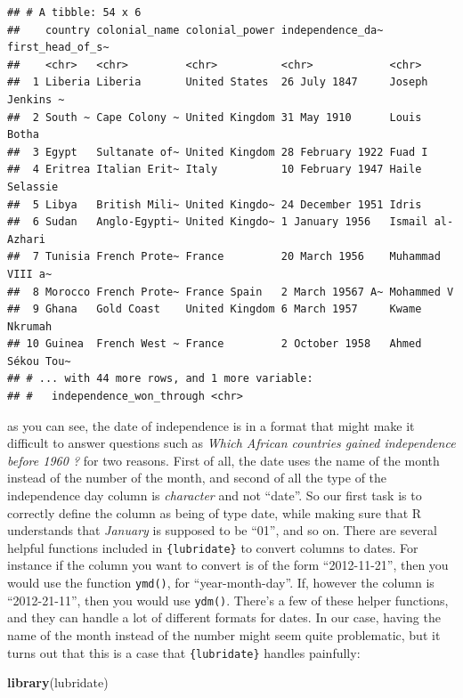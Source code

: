 \documentclass[]{gitbook}
\newenvironment{Shaded}{\begin{snugshade}}{\end{snugshade}}
\newcommand{\KeywordTok}[1]{\textcolor[rgb]{0.13,0.29,0.53}{\textbf{#1}}}
\newcommand{\NormalTok}[1]{#1}
\begin{document}
\begin{verbatim}
## # A tibble: 54 x 6
##    country colonial_name colonial_power independence_da~ first_head_of_s~
##    <chr>   <chr>         <chr>          <chr>            <chr>           
##  1 Liberia Liberia       United States  26 July 1847     Joseph Jenkins ~
##  2 South ~ Cape Colony ~ United Kingdom 31 May 1910      Louis Botha     
##  3 Egypt   Sultanate of~ United Kingdom 28 February 1922 Fuad I          
##  4 Eritrea Italian Erit~ Italy          10 February 1947 Haile Selassie  
##  5 Libya   British Mili~ United Kingdo~ 24 December 1951 Idris           
##  6 Sudan   Anglo-Egypti~ United Kingdo~ 1 January 1956   Ismail al-Azhari
##  7 Tunisia French Prote~ France         20 March 1956    Muhammad VIII a~
##  8 Morocco French Prote~ France Spain   2 March 19567 A~ Mohammed V      
##  9 Ghana   Gold Coast    United Kingdom 6 March 1957     Kwame Nkrumah   
## 10 Guinea  French West ~ France         2 October 1958   Ahmed Sékou Tou~
## # ... with 44 more rows, and 1 more variable:
## #   independence_won_through <chr>
\end{verbatim}

as you can see, the date of independence is in a format that might make it difficult to answer questions
such as \emph{Which African countries gained independence before 1960 ?} for two reasons. First of all,
the date uses the name of the month instead of the number of the month, and second of all the type of
the independence day column is \emph{character} and not ``date''. So our first task is to correctly define the column
as being of type date, while making sure that R understands that \emph{January} is supposed to be ``01'', and so
on. There are several helpful functions included in \texttt{\{lubridate\}} to convert columns to dates. For instance
if the column you want to convert is of the form ``2012-11-21'', then you would use the function \texttt{ymd()},
for ``year-month-day''. If, however the column is ``2012-21-11'', then you would use \texttt{ydm()}. There's
a few of these helper functions, and they can handle a lot of different formats for dates. In our case,
having the name of the month instead of the number might seem quite problematic, but it turns out
that this is a case that \texttt{\{lubridate\}} handles painfully:

\begin{Shaded}
\begin{Highlighting}[]
\KeywordTok{library}\NormalTok{(lubridate)}
\end{Highlighting}
\end{Shaded}
\end{document}
